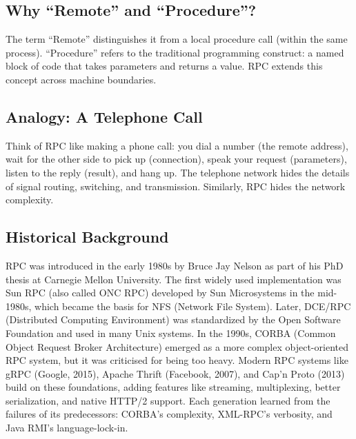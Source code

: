 \documentclass[10pt,a4paper]{article}
\begin{document}
\subsection{Why “Remote” and “Procedure”?}
The term “Remote” distinguishes it from a local procedure call (within the same process). “Procedure” refers to the traditional programming construct: a named block of code that takes parameters and returns a value. RPC extends this concept across machine boundaries.

\subsection{Analogy: A Telephone Call}
Think of RPC like making a phone call: you dial a number (the remote address), wait for the other side to pick up (connection), speak your request (parameters), listen to the reply (result), and hang up. The telephone network hides the details of signal routing, switching, and transmission. Similarly, RPC hides the network complexity.

\subsection{Historical Background}
RPC was introduced in the early 1980s by Bruce Jay Nelson as part of his PhD thesis at Carnegie Mellon University. The first widely used implementation was Sun RPC (also called ONC RPC) developed by Sun Microsystems in the mid-1980s, which became the basis for NFS (Network File System). Later, DCE/RPC (Distributed Computing Environment) was standardized by the Open Software Foundation and used in many Unix systems. In the 1990s, CORBA (Common Object Request Broker Architecture) emerged as a more complex object-oriented RPC system, but it was criticised for being too heavy. Modern RPC systems like gRPC (Google, 2015), Apache Thrift (Facebook, 2007), and Cap’n Proto (2013) build on these foundations, adding features like streaming, multiplexing, better serialization, and native HTTP/2 support. Each generation learned from the failures of its predecessors: CORBA’s complexity, XML-RPC’s verbosity, and Java RMI’s language-lock-in.
\end{document}
